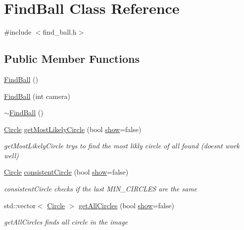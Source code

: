 \hypertarget{class_find_ball}{}\section{Find\+Ball Class Reference}
\label{class_find_ball}


{\ttfamily \#include $<$find\+\_\+ball.\+h$>$}

\subsection*{Public Member Functions}
\begin{DoxyCompactItemize}
\item 
\hyperlink{class_find_ball_a8e32037eac65317cf2a7e62374ec0906}{Find\+Ball} ()
\item 
\hyperlink{class_find_ball_a09f0b879fb3e49918dc79f456eca8f05}{Find\+Ball} (int camera)
\item 
\hyperlink{class_find_ball_ad058e45981d0ce595536717a5283dd6c}{$\sim$\+Find\+Ball} ()
\item 
\hyperlink{struct_circle}{Circle} \hyperlink{class_find_ball_a11094b7b426f6c92281b3c86c04fe0ca}{get\+Most\+Likely\+Circle} (bool \hyperlink{navigation__goals_8cpp_a5bafc98f16f9fd53e0f929fe20b17e1c}{show}=false)
\begin{DoxyCompactList}\small\item\em get\+Most\+Likely\+Circle trys to find the most likly circle of all found (doesnt work well) \end{DoxyCompactList}\item 
\hyperlink{struct_circle}{Circle} \hyperlink{class_find_ball_a70aa01417f7b8a9290a54fa76aad0c48}{consistent\+Circle} (bool \hyperlink{navigation__goals_8cpp_a5bafc98f16f9fd53e0f929fe20b17e1c}{show}=false)
\begin{DoxyCompactList}\small\item\em consistent\+Circle checks if the last M\+I\+N\+\_\+\+C\+I\+R\+C\+L\+E\+S are the same \end{DoxyCompactList}\item 
std\+::vector$<$ \hyperlink{struct_circle}{Circle} $>$ \hyperlink{class_find_ball_a5e0091b31bb086be4805bf961c996ef0}{get\+All\+Circles} (bool \hyperlink{navigation__goals_8cpp_a5bafc98f16f9fd53e0f929fe20b17e1c}{show}=false)
\begin{DoxyCompactList}\small\item\em get\+All\+Circles finds all circle in the image \end{DoxyCompactList}\item 

\end{DoxyCompactItemize}
